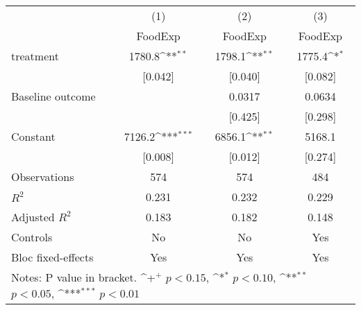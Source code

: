 {
\def\sym#1{\ifmmode^{#1}\else\(^{#1}\)\fi}
\begin{tabular*}{1.2\hsize}{@{\hskip\tabcolsep\extracolsep\fill}l*{3}{c}}
\cline{1-4}\cline{1-4}
     &\multicolumn{1}{c}{(1)}&\multicolumn{1}{c}{(2)}&\multicolumn{1}{c}{(3)}\\
     &\multicolumn{1}{c}{FoodExp}&\multicolumn{1}{c}{FoodExp}&\multicolumn{1}{c}{FoodExp}\\
\cline{1-4}
treatment&1780.8\sym{**} &1798.1\sym{**} &1775.4\sym{*}  \\
     &[0.042]         &[0.040]         &[0.082]         \\
[1em]
Baseline outcome&           &0.0317         &0.0634         \\
     &           &[0.425]         &[0.298]         \\
[1em]
Constant&7126.2\sym{***}&6856.1\sym{**} &5168.1         \\
     &[0.008]         &[0.012]         &[0.274]         \\
\cline{1-4}
Observations&574         &574         &484         \\
\(R^{2}\)&0.231         &0.232         &0.229         \\
Adjusted \(R^{2}\)&0.183         &0.182         &0.148         \\
Controls&No         &No         &Yes         \\
Bloc fixed-effects&Yes         &Yes         &Yes         \\
\cline{1-4}\cline{1-4}
\multicolumn{4}{p{1.0\textwidth}}{\footnotesize Notes: P value in bracket. \sym{+} \(p<0.15\), \sym{*} \(p<0.10\), \sym{**} \(p<0.05\), \sym{***} \(p<0.01\)}\\
\end{tabular*}
}
